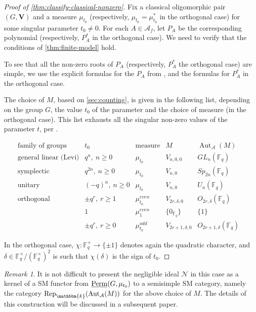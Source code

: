 \documentclass[11pt,a4paper]{amsart}
\theoremstyle{plain}%
\theoremstyle{definition}
\theoremstyle{remark}
\newtheorem{remark}[lemma]{Remark}
\newcommand{\Aut}{{\operatorname{Aut}}}
\newcommand{\V}{\mathbf{V}}
\newcommand{\Perm}{\underline{{\rm Perm}}}
\newcommand{\Rep}{\operatorname{Rep}}
\newcommand{\F}{{\mathbb F}}
\newcommand{\kk}{\mathbbm{k}}
\begin{document}
\begin{proof}[Proof of \cref{thm:classify-classical-nonzero}] 
  Fix a classical oligomorphic pair $(G, \V)$ and a measure $\mu_{t_0}$ (respectively, $\mu_{t_0}=\mu_{t_0}^*$ in the orthogonal case) for some singular parameter $t_0\neq 0$. For each $A\in \mathcal{A}_f$, let $P_A$ be the corresponding polynomial (respectively, $P_A^*$ in the orthogonal case).  We need to verify that the conditions of \cref{thm:finite-model} hold.

  To see that all the non-zero roots of $P_A$ (respectively, $P_A^*$ the orthogonal case) are simple, we use the explicit formulas for the $P_A$ from \cite[Propositions~6.3, 8.3, 10.4]{HS-classical}, and the formulas \cite[Proposition~9.5]{HS-classical} for $P_A^*$ in the orthogonal case.


  



The choice of $M$, based on \cref{sec:counting}, is given in the following list, depending on the group $G$, the value $t_0$ of the parameter and the choice of measure (in the orthogonal case).  This list exhausts all the singular non-zero values of the parameter $t$, per \cite{HS-classical}.

\[
\begin{array}{c|c|c|c|c}
\text{family of groups}&t_0&\text{measure}& M &\Aut_{\mathcal{A}}(M)\\ \hline
\text{general linear (Levi)} &q^n,~ n\geq 0&\mu_{t_0}&V_{n,0,0}&GL_n(\F_q)\\
\text{symplectic} &q^{2n},~ n\geq 0&\mu_{t_0}&V_{n,0}&Sp_{2n}(\F_q)\\
\text{unitary}&(-q)^n,~ n\geq 0&\mu_{t_0}&V_{n,0}&U_n(\F_q)\\
\text{orthogonal}& \pm q^r,~ r\geq 1&\mu^{even}_{t_0}& V_{2r,\delta,0}& O_{2r,\delta }(\F_q)\\
& 1&\mu^{even}_{1}& \{0_{\F_q}\}& \{1\}\\
& \pm q^r, ~r\geq 0&\mu^{odd}_{t_0}& V_{2r+1,\delta,0}& O_{2r+1,\delta }(\F_q)
\end{array}
\]

  In the orthogonal case, $\chi: \F_q^{\times} \to \{\pm 1\}$ denotes again the quadratic character, and {$\delta\in\F_q^\times/(\F_q^\times)^2$} is such that $\chi({\delta})$ is the sign of $t_0$. 



\end{proof}

\begin{remark}
    It is not difficult to present the negligible ideal $\mathcal{N}$ in this case as a kernel of a SM functor from $\Perm(G, \mu_{t_0})$ to a semisimple SM category, namely the category $ \Rep_{\kk}(\Aut_{\mathcal{A}}(M))$ for the above choice of $M$. The details of this construction will be discussed in a subsequent paper. 
\end{remark}
\end{document}
